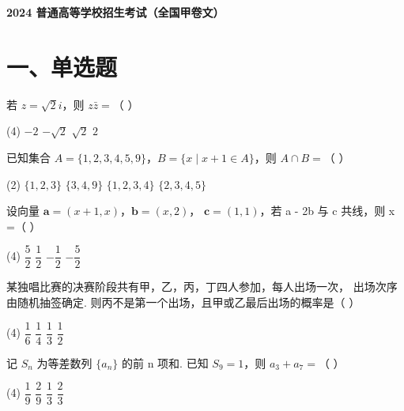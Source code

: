 \documentclass[UTF8,12pt]{ctexart}
\newcommand{\examtitle}{2024 普通高等学校招生考试（全国甲卷文）}
\newcommand{\makeexamtitle}{%
  \begin{center}
    {\LARGE\bfseries\examtitle}\par
  \end{center}\vspace{0.4em}}
\begin{document}
\makeexamtitle

\section*{一、单选题}

\begin{questions}

  \item 若 $z=\sqrt2i$，则 $z\bar z=$（ ）

    \begin{tasks}(4)
      \task $-2$
      \task $-\sqrt2$
      \task $\sqrt2$
      \task $2$
    \end{tasks}

  \item 已知集合 $A=\{1,2,3,4,5,9\}$，$B=\{x\mid x+1\in A\}$，则 $A\cap B=$（ ）

    \begin{tasks}(2)
      \task $\{1,2,3\}$
      \task $\{3,4,9\}$
      \task $\{1,2,3,4\}$
      \task $\{2,3,4,5\}$
    \end{tasks}

  \item 设向量 $\boldsymbol{a}=(x+1,x)$，$\boldsymbol{b}=(x,2)$，%
    $\boldsymbol{c}=(1,1)$，若 a - 2b 与 c 共线，则 x =（ ）

    \begin{tasks}(4)
      \task $\dfrac52$
      \task $\dfrac12$
      \task $-\dfrac12$
      \task $-\dfrac52$
    \end{tasks}

  \item 某独唱比赛的决赛阶段共有甲，乙，丙，丁四人参加，每人出场一次，
    出场次序由随机抽签确定. 则丙不是第一个出场，且甲或乙最后出场的概率是（ ）

    \begin{tasks}(4)
      \task $\dfrac16$
      \task $\dfrac14$
      \task $\dfrac13$
      \task $\dfrac12$
    \end{tasks}

  \item 记 $S_n$ 为等差数列 $\{a_n\}$ 的前 n 项和. 已知 $S_9=1$，则 $a_3+a_7=$（ ）

    \begin{tasks}(4)
      \task $\dfrac19$
      \task $\dfrac29$
      \task $\dfrac13$
      \task $\dfrac23$
    \end{tasks}


\end{questions}
\end{document}
